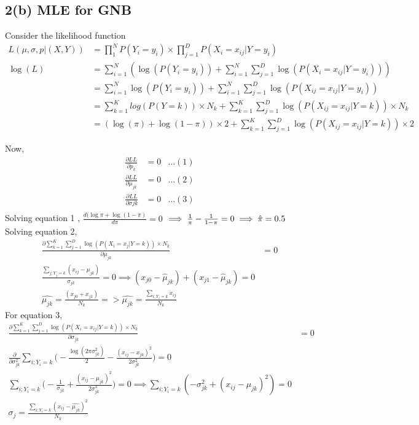 \documentclass[10pt,letterpaper]{article}
\begin{document}
\subsection{2(b) MLE for GNB}
Consider the likelihood function 
\begin{align*}
L(\mu,\sigma,p|(X,Y)) &=  \prod_{1}^N P(Y_i=y_i)\times \prod_{j=1}^D P(X_i=x_{ij}|Y=y_i)\\
\log(L)&= \sum_{i=1}^N ( \log(P(Y_i=y_i)) +\sum_{i=1}^N \sum_{j=1}^D \log(P(X_i=x_{ij}|Y=y_{i})) )\\
&= \sum_{i=1}^N \log(P(Y_i=y_i)) +\sum_{i=1}^N \sum_{j=1}^D \log(P(X_{ij}=x_{ij}|Y=y_{i}))\\
&=\sum_{k=1}^K log(P(Y=k)) \times N_k + \sum_{k=1}^K \sum_{j=1}^D \log(P(X_{ij}=x_{ij}|Y=k)) \times N_k\\
&= (\log(\pi)+\log(1-\pi)) \times 2   + \sum_{k=1}^K \sum_{j=1}^D \log(P(X_{ij}=x_{ij}|Y=k)) \times 2
\end{align*}

Now, 
\begin{align*}
\frac{\partial{LL}}{\partial{p_k}}&=0 &\dots (1)\\
\frac{\partial{LL}}{\partial{\mu_{jk}}}&=0 &\dots (2)\\
\frac{\partial{LL}}{\partial{\sigma{jk}}}&=0 &\dots (3)\\
\end{align*}
Solving equation 1 , 
$\frac{d (\log\pi +\log(1-\pi)}{d\pi}=0$ $\implies  \frac{1}{\pi} -\frac{1}{1-\pi}=0\\
 \implies \hat\pi =0.5$\\

Solving equation 2,
\begin{align*}
\frac{\partial{\sum_{k=1}^K \sum_{j=1}^D \log(P(X_i=x_{j}|Y=k)) \times N_k}}{\partial \mu_{jk}} &=0\\
\frac{\sum_{j;Y_j=k}(x_{ij}-\mu_{jk})}{\sigma_{jk}}=0 \implies (x_{j0}- \hat\mu_{jk}) +(x_{j1}- \hat\mu_{jk})=0\\
\hat{\mu_{jk}} = \frac{(x_{j0} + x_{j1})}{N_k} => \hat{\mu_{jk}} = \frac{\sum_{i;Y_i=k}x_{ij}}{N_k}
\end{align*}
For equation 3,
\begin{align*}
\frac{\partial{\sum_{k=1}^K \sum_{j=1}^D \log(P(X_i=x_{ij}|Y=k)) \times N_k}}{\partial \sigma_{jk}} &=0\\
\frac{\partial}{\partial{\sigma_{jk}^2}}\sum_{i;Y_i=k}\big(-\frac{\log(2\pi \sigma_{jk}^2)}{2} - \frac{(x_{ij}-x_{jk})^2}{2\sigma_{jk}^2}\big)=0\\
\sum_{i;Y_i=k}\big(-\frac{1}{\sigma_{jk}} + \frac{(x_{ij}-\mu_{jk})^2}{2\sigma_{jk}^3}\big)=0 \implies\sum_{i;Y_i=k}  (-\sigma_{jk}^2 + (x_{ij}-\mu_{jk})^2)=0\\
\hat{\sigma_{j}}=\frac{\sum_{i;Y_i=k}(x_{ij}-\hat{\mu_{jk}})^2}{N_k}
\end{align*}
\end{document}
